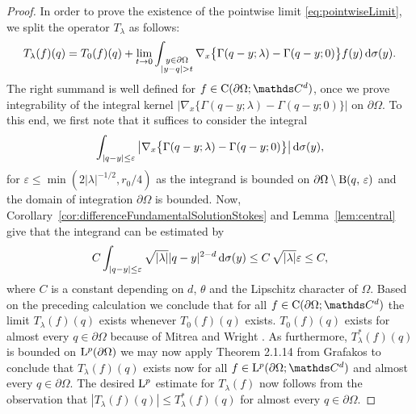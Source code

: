 \begin{proof}
   In order to prove the existence of the pointwise limit \eqref{eq:pointwiseLimit},  we split the operator $T_\lambda$ as follows:
   \begin{align*}
     T_\lambda(f)(q) = T_0(f)(q) + \lim_{t \to 0} \int_{\substack{y \in \partial\Omega \\ |y - q| > t}} \nabla_x \big\{ \Gamma(q - y; \lambda) - \Gamma(q - y; 0)\big\}  f(y) \, {\operatorname{d}\!{\sigma}}(y).
   \end{align*}
   The right summand is well defined for $f \in \CC(\partial\Omega; \C^d)$, once we prove integrability of the integral kernel $\big|\nabla_x \big\{\Gamma(q - y; \lambda) - \Gamma(q - y; 0)\big\} \big|$ on $\partial\Omega$.
   To this end, we first note that it suffices to consider the integral
   \begin{align*}
     \int_{|q - y| \leq \varepsilon} \big| \nabla_x\big\{ \Gamma(q - y; \lambda) - \Gamma(q - y; 0) \big\} \big| \, {\operatorname{d}\!{\sigma}}(y), 
   \end{align*}
   for $\varepsilon \leq \min(2|\lambda|^{-1/2}, r_0/4)$ as the integrand is bounded on $\partial\Omega \setminus \mathrm{B}(q,\,\varepsilon)$  and the domain of integration $\partial\Omega$ is bounded.
   Now, Corollary~\ref{cor:differenceFundamentalSolutionStokes} and Lemma~\ref{lem:central} give that the integrand can be estimated by
   \begin{align*}
     C \int_{|q - y| \leq \varepsilon} \sqrt{|\lambda|} |q - y|^{2 - d} \, {\operatorname{d}\!{\sigma}}(y) 
     \leq C\, \sqrt{|\lambda|} \varepsilon \leq C,
   \end{align*}
   where $C$ is a constant depending on $d$, $\theta$ and the Lipschitz character of $\Omega$.
   Based on the preceding calculation we conclude that for all $f \in \CC(\partial\Omega; \C^d)$ the limit $T_\lambda(f)(q)$ exists whenever $T_0(f)(q)$ exists.
   $T_0(f)(q)$ exists for almost every $q \in \partial\Omega$ because of Mitrea and Wright \cite{mitreaWright}.
   As furthermore, $T_\lambda^*(f)(q)$ is bounded on $\mathrm{L}^p(\partial\Omega)$  we may now apply Theorem 2.1.14 from Grafakos \cite{grafakos2014classical} to conclude that $T_\lambda(f)(q)$ exists now for all $f \in \Ell^p(\partial\Omega; \C^d)$ and almost every $q \in \partial\Omega$.
   The desired $\mathrm{L}^p$ estimate for $T_\lambda(f)$ now follows from the observation that $| T_\lambda(f)(q) | \leq T_\lambda^*(f)(q)$ for almost every $q \in \partial\Omega$.
\end{proof}

